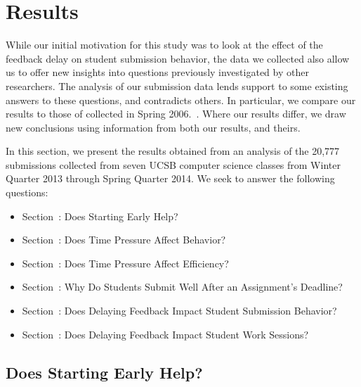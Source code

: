\section{Results}
While our initial motivation for this study was to look at the effect of the
feedback delay on student submission behavior, the data we collected also allow
us to offer new insights into questions previously investigated by other
researchers. The analysis of our submission data lends support to some existing
answers to these questions, and contradicts others. In particular, we compare
our results to those of \spacco{} collected in Spring
2006.~\cite{Spacco:2013:TIP:2462476.2465594}. Where our results differ, we draw
new conclusions using information from both our results, and theirs.

In this section, we present the results obtained from an analysis of the 20,777
submissions collected from seven UCSB computer science classes from Winter
Quarter 2013 through Spring Quarter 2014. We seek to answer the following
questions:

\begin{itemize}
\item Section~: Does Starting Early Help?
\item Section~: Does Time Pressure Affect Behavior?
\item Section~: Does Time Pressure Affect Efficiency?
\item Section~: Why Do Students Submit Well After an
  Assignment's Deadline?
\item Section~: Does Delaying Feedback Impact Student
  Submission Behavior?
\item Section~: Does Delaying Feedback Impact Student
  Work Sessions?
\end{itemize}

\subsection{Does Starting Early Help?}

